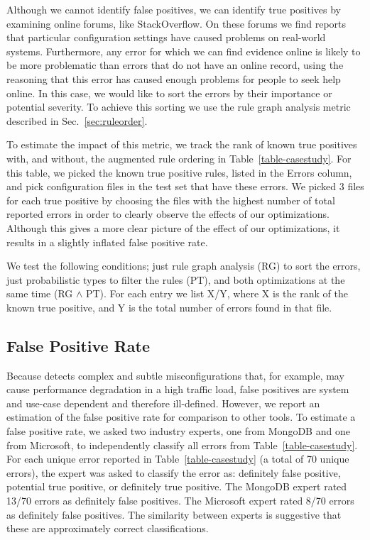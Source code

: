 Although we cannot identify false positives, we can identify true positives by examining online forums, like StackOverflow.
On these forums we find reports that particular configuration settings have caused problems on real-world systems.
Furthermore, any error for which we can find evidence online is likely to be more problematic than errors that do not have an online record, 
  using the reasoning that this error has caused enough problems for people to seek help online.
In this case, we would like \app to sort the errors by their importance or potential severity.
To achieve this sorting we use the rule graph analysis metric described in Sec.~\ref{sec:ruleorder}.

To estimate the impact of this metric, we track the rank of known true positives with, and without, the augmented rule ordering in Table~\ref{table-casestudy}.
For this table, we picked the known true positive rules, listed in the Errors column, and pick configuration files in the test set that have these errors.
We picked 3 files for each true positive by choosing the files with the highest number of total reported errors in order to clearly observe the effects of our optimizations.
Although this gives a more clear picture of the effect of our optimizations, it results in a slightly inflated false positive rate.

We test the following conditions; just rule graph analysis (RG) to sort the errors, just probabilistic types to filter the rules (PT), and both optimizations at the same time (RG $\land$ PT).
For each entry we list X/Y, where X is the rank of the known true positive, and Y is the total number of errors found in that file.



\subsection{False Positive Rate}

Because \app detects complex and subtle misconfigurations that, for example, may cause performance degradation in a high traffic load, false positives are system and use-case dependent and therefore ill-defined.
However, we report an estimation of the false positive rate for comparison to other tools.
To estimate a false positive rate, we asked two industry experts, one from MongoDB and one from Microsoft, to independently classify all errors from Table~\ref{table-casestudy}.
For each unique error reported in Table~\ref{table-casestudy} (a total of 70 unique errors), the expert was asked to classify the error as: definitely false positive, potential true positive, or definitely true positive. 
The MongoDB expert rated 13/70 errors as definitely false positives. 
The Microsoft expert rated 8/70 errors as definitely false positives. 
The similarity between experts is suggestive that these are approximately correct classifications.

